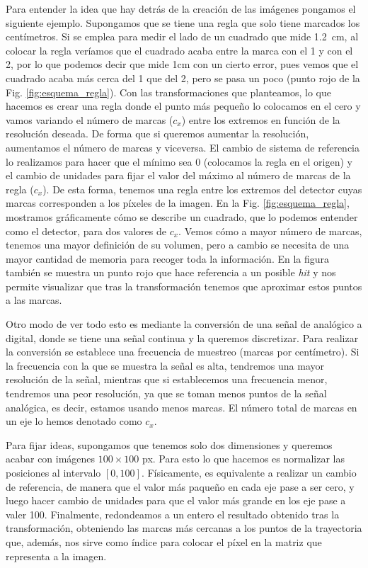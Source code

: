 \documentclass[a4paper,12pt,oneside,titlepage]{book}
\begin{document}
Para entender la idea que hay detrás de la creación de las imágenes pongamos el siguiente ejemplo. Supongamos que se tiene una regla que solo tiene marcados los centímetros. Si se emplea para medir el lado de un cuadrado que mide \SI[]{1.2}{cm}, al colocar la regla veríamos que el cuadrado acaba entre la marca con el 1 y con el 2, por lo que podemos decir que mide \si[]{1}{cm} con un cierto error, pues vemos que el cuadrado acaba más cerca del 1 que del 2, pero se pasa un poco (punto rojo de la Fig. \ref{fig:esquema_regla}). Con las transformaciones que planteamos, lo que hacemos es crear una regla donde el punto más pequeño lo colocamos en el cero y vamos variando el número de marcas ($c_x$) entre los extremos en función de la resolución deseada. De forma que si queremos aumentar la resolución, aumentamos el número de marcas y viceversa. El cambio de sistema de referencia lo realizamos para hacer que el mínimo sea 0 (colocamos la regla en el origen) y el cambio de unidades para fijar el valor del máximo al número de marcas de la regla ($c_x$). De esta forma, tenemos una regla entre los extremos del detector cuyas marcas corresponden a los píxeles de la imagen. En la Fig. \ref{fig:esquema_regla}, mostramos gráficamente cómo se describe un cuadrado, que lo podemos entender como el detector, para dos valores de $c_x$. Vemos cómo a mayor número de marcas, tenemos una mayor definición de su volumen, pero a cambio se necesita de una mayor cantidad de memoria para recoger toda la información. En la figura también se muestra un punto rojo que hace referencia a un posible \textit{hit} y nos permite visualizar que tras la transformación tenemos que aproximar estos puntos a las marcas.  

Otro modo de ver todo esto es mediante la conversión de una señal de analógico a digital, donde se tiene una señal continua y la queremos discretizar. Para realizar la conversión se establece una frecuencia de muestreo (marcas por centímetro). Si la frecuencia con la que se muestra la señal es alta, tendremos una mayor resolución de la señal, mientras que si establecemos una frecuencia menor, tendremos una peor resolución, ya que se toman menos puntos de la señal analógica, es decir, estamos usando menos marcas. El número total de marcas en un eje lo hemos denotado como $c_x$.

Para fijar ideas, supongamos que tenemos solo dos dimensiones y queremos acabar con imágenes $100\times100$ px. Para esto lo que hacemos es normalizar las posiciones al intervalo $\left[0, 100\right]$. Físicamente, es equivalente a realizar un cambio de referencia, de manera que el valor más paqueño en cada eje pase a ser cero, y luego hacer cambio de unidades para que el valor más grande en los eje pase a valer 100. Finalmente, redondeamos a un entero el resultado obtenido tras la transformación, obteniendo las marcas más cercanas a los puntos de la trayectoria que, además, nos sirve como índice para colocar el píxel en la matriz que representa a la imagen.
\end{document}
